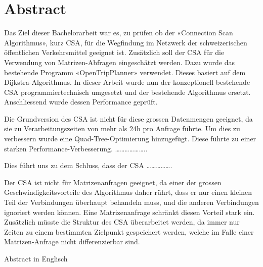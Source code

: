 \section{Abstract}
Das Ziel dieser Bachelorarbeit war es, zu prüfen ob der «Connection Scan Algorithmus», kurz CSA, für die Wegfindung im Netzwerk der schweizerischen öffentlichen Verkehrsmittel geeignet ist. Zusätzlich soll der CSA für die Verwendung von Matrizen-Abfragen eingeschätzt werden. Dazu wurde das bestehende Programm «OpenTripPlanner» verwendet. Dieses basiert auf dem Dijkstra-Algorithmus. In dieser Arbeit wurde nun der konzeptionell bestehende CSA programmiertechnisch umgesetzt und der bestehende Algorithmus ersetzt. Anschliessend wurde dessen Performance geprüft.
\newline


Die Grundversion des CSA ist nicht für diese grossen Datenmengen geeignet, da sie zu Verarbeitungszeiten von mehr als 24h pro Anfrage führte. Um dies zu verbessern wurde eine Quad-Tree-Optimierung hinzugefügt. Diese führte zu einer starken Performance-Verbesserung. ………………..
\newline


Dies führt uns zu dem Schluss, dass der CSA …………….
\newline


Der CSA ist nicht für Matrizenanfragen geeignet, da einer der grossen Geschwindigkeitsvorteile des Algorithmus daher rührt, dass er nur einen kleinen Teil der Verbindungen überhaupt behandeln muss, und die anderen Verbindungen ignoriert werden können. Eine Matrizenanfrage schränkt diesen Vorteil stark ein. Zusätzlich müsste die Struktur des CSA überarbeitet werden, da immer nur Zeiten zu einem bestimmten Zielpunkt gespeichert werden, welche im Falle einer Matrizen-Anfrage nicht differenzierbar sind. 
\newpage




Abstract in Englisch